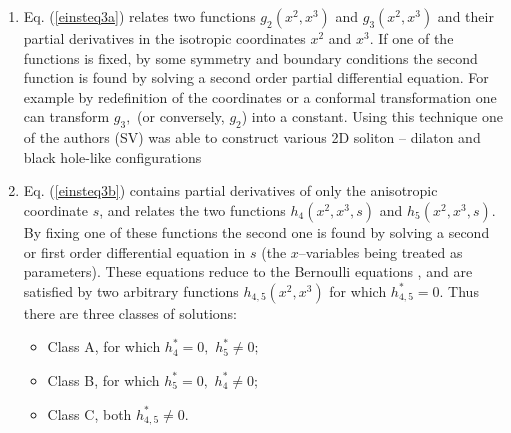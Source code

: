 \documentclass[a4paper,preprint,prabib,aps]{revtex4}
\begin{document}
\begin{enumerate}
\item  Eq. (\ref{einsteq3a}) relates two functions $g_2(x^2,x^3)$ and $
g_3(x^2,x^3)$ and their partial derivatives in the isotropic coordinates $x^2
$ and $x^3.$ If one of the functions is fixed, by some symmetry and boundary
conditions the second function is found by solving a second order partial
differential equation. For example by redefinition of the coordinates or a
conformal transformation one can transform $g_3,$ (or conversely, $g_2$)
into a constant. Using this technique one of the authors (SV) was able to
construct various 2D soliton -- dilaton and black hole-like configurations
\cite{v}

\item  Eq. (\ref{einsteq3b}) contains partial derivatives of only the
anisotropic coordinate $s$, and relates the two functions $h_4(x^2,x^3,s)$
and $h_5(x^2,x^3,s)$. By fixing one of these functions the second one is
found by solving a second or first order differential equation in $s$ (the $x
$--variables being treated as parameters). These equations reduce to the
Bernoulli equations \cite{kamke}, and are satisfied by two arbitrary
functions $h_{4,5}(x^2,x^3)$ for which $h_{4,5}^{*}=0.$ Thus there are three
classes of solutions:

\begin{itemize}
\item  Class A, for which $h_4^{*}=0,$ $h_5^{*}\neq 0;$

\item  Class B, for which $h_5^{*}=0,$ $h_4^{*}\neq 0;$

\item  Class C, both $h_{4,5}^{*}\neq 0.$
\end{itemize}


\end{enumerate}
\end{document}
